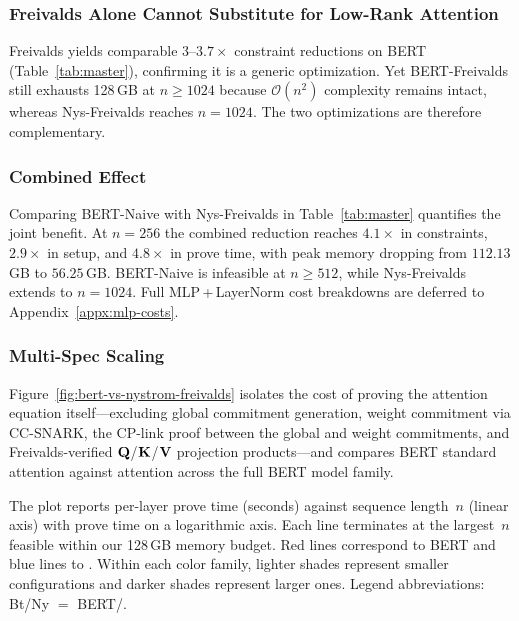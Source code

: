\documentclass[runningheads]{llncs}
\begin{document}
\subsubsection{Freivalds Alone Cannot Substitute for Low-Rank Attention}
\label{subsec:freivalds-not-enough}
Freivalds yields comparable $3$--$3.7{\times}$ constraint reductions on BERT (Table~\ref{tab:master}), confirming it is a generic optimization. Yet BERT-Freivalds still exhausts 128\,GB at $n{\geq}1024$ because $\mathcal{O}(n^2)$ complexity remains intact, whereas Nys-Freivalds reaches $n{=}1024$. The two optimizations are therefore complementary.

\subsubsection{Combined Effect}
\label{subsec:combined-effect}
Comparing BERT-Naive with Nys-Freivalds in Table~\ref{tab:master} quantifies the joint benefit. At $n{=}256$ the combined reduction reaches $4.1{\times}$ in constraints, $2.9{\times}$ in setup, and $4.8{\times}$ in prove time, with peak memory dropping from $112.13$\,GB to $56.25$\,GB. BERT-Naive is infeasible at $n{\geq}512$, while Nys-Freivalds extends to $n{=}1024$. Full MLP\,+\,LayerNorm cost breakdowns are deferred to Appendix~\ref{appx:mlp-costs}.



\subsubsection{Multi-Spec Scaling}
\label{subsec:multi-spec}

Figure~\ref{fig:bert-vs-nystrom-freivalds} isolates the cost of proving the attention equation itself---excluding global commitment generation, weight commitment via CC-SNARK, the CP-link proof between the global and weight commitments, and Freivalds-verified ${\mathbf{Q}}$/${\mathbf{K}}$/${\mathbf{V}}$ projection products---and compares BERT standard attention against \nystrom attention across the full BERT model family.

The plot reports per-layer prove time (seconds) against sequence length~$n$ (linear axis) with prove time on a logarithmic axis. Each line terminates at the largest~$n$ feasible within our 128\,GB memory budget. Red lines correspond to BERT and blue lines to \nystrom. Within each color family, lighter shades represent smaller configurations and darker shades represent larger ones. Legend abbreviations: Bt/Ny $=$ BERT/\nystrom.
\end{document}
